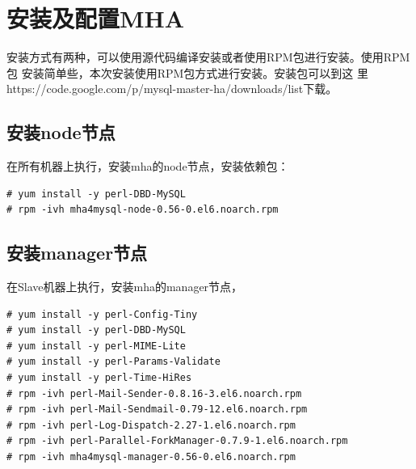 \section{安装及配置MHA}
\label{sec:InstallMHANode}

安装方式有两种，可以使用源代码编译安装或者使用RPM包进行安装。使用RPM包
安装简单些，本次安装使用RPM包方式进行安装。安装包可以到这
里https://code.google.com/p/mysql-master-ha/downloads/list下载。

\subsection{安装node节点}
\label{sec:InstallNode}

在所有机器上执行，安装mha的node节点，安装依赖包：

\begin{verbatim}
# yum install -y perl-DBD-MySQL
# rpm -ivh mha4mysql-node-0.56-0.el6.noarch.rpm
\end{verbatim}

\subsection{安装manager节点}
\label{sec:InstallManager}

在Slave机器上执行，安装mha的manager节点，

\begin{verbatim}
# yum install -y perl-Config-Tiny
# yum install -y perl-DBD-MySQL
# yum install -y perl-MIME-Lite
# yum install -y perl-Params-Validate
# yum install -y perl-Time-HiRes
# rpm -ivh perl-Mail-Sender-0.8.16-3.el6.noarch.rpm
# rpm -ivh perl-Mail-Sendmail-0.79-12.el6.noarch.rpm
# rpm -ivh perl-Log-Dispatch-2.27-1.el6.noarch.rpm
# rpm -ivh perl-Parallel-ForkManager-0.7.9-1.el6.noarch.rpm
# rpm -ivh mha4mysql-manager-0.56-0.el6.noarch.rpm
\end{verbatim}




